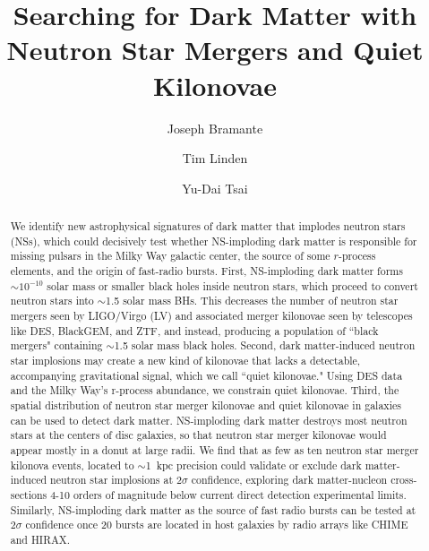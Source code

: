 \documentclass[nofootinbib,longbibliography,prd,floatfix,superscriptaddress,twocolumn]{revtex4-1}
\begin{document}
\title{Searching for Dark Matter with Neutron Star Mergers and Quiet Kilonovae}

\author{Joseph Bramante}

\author{Tim Linden}

\author{Yu-Dai Tsai}

\begin{abstract}
We identify new astrophysical signatures of dark matter that implodes neutron stars (NSs), which could decisively test whether NS-imploding dark matter is responsible for missing pulsars in the Milky Way galactic center, the source of some $r$-process elements, and the origin of fast-radio bursts. First, NS-imploding dark matter forms $\sim  10^{-10}$ solar mass or smaller black holes inside neutron stars, which proceed to convert neutron stars into $\sim$1.5 solar mass BHs. This decreases the number of neutron star mergers seen by LIGO/Virgo (LV) and associated merger kilonovae seen by telescopes like DES, BlackGEM, and ZTF, and instead, producing a population of ``black mergers" containing $\sim$1.5 solar mass black holes. Second, dark matter-induced neutron star implosions may create a new kind of kilonovae that lacks a detectable, accompanying gravitational signal, which we call ``quiet kilonovae." Using DES data and the Milky Way's r-process abundance, we constrain quiet kilonovae. Third, the spatial distribution of neutron star merger kilonovae and quiet kilonovae in galaxies can be used to detect dark matter. NS-imploding dark matter destroys most neutron stars at the centers of disc galaxies, so that neutron star merger kilonovae would appear mostly in a donut at large radii. We find that as few as ten neutron star merger kilonova events, located to $\sim$1~kpc precision could validate or exclude dark matter-induced neutron star implosions at $2 \sigma$ confidence, exploring dark matter-nucleon cross-sections 4-10 orders of magnitude below current direct detection experimental limits. Similarly, NS-imploding dark matter as the source of fast radio bursts can be tested at $2 \sigma$ confidence once 20 bursts are located in host galaxies by radio arrays like CHIME and HIRAX. 
\end{abstract}
\end{document}
